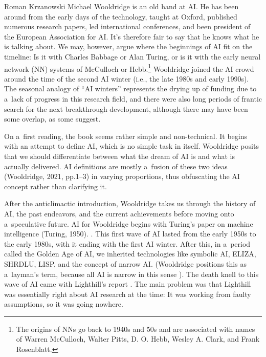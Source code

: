 \begin{newrevengenv}{Roman Krzanowski}
Michael Wooldridge is an old hand at AI. He has been around from the early days of the technology, taught at Oxford, published numerous research papers, led international conferences, and been president of the European Association for AI. It’s therefore fair to say that he knows what he is talking about. We may, however, argue where the beginnings of AI fit on the timeline: Is it with Charles Babbage or Alan Turing, or is it with the early neural network (NN) systems of McCulloch or Hebb.\footnote{The origins of NNs go back to 1940s and 50s and are associated with names of Warren McCulloch, Walter Pitts, D. O. Hebb, Wesley A. Clark, and Frank Rosenblatt.} Wooldridge joined the AI crowd around the time of the second AI winter (i.e., the late 1980s and early 1990s). The seasonal analogy of ``AI winters'' represents the drying up of funding due to a~lack of progress in this research field, and there were also long periods of frantic search for the next breakthrough development, although there may have been some overlap, as some suggest.

On a~first reading, the book seems rather simple and non-technical. It begins with an attempt to define AI, which is no simple task in itself. Wooldridge posits that we should differentiate between what the dream of AI is and what is actually delivered. AI definitions are mostly a~fusion of these two ideas (Wooldridge, 2021, pp.1–3) in varying proportions, thus obfuscating the AI concept rather than clarifying it.

After the anticlimactic introduction, Wooldridge takes us through the history of AI, the past endeavors, and the current achievements before moving onto a~speculative future. AI for Wooldridge begins with Turing’s paper on machine intelligence
(Turing, 1950).
\parencite{turing_computing_1950}.
This first wave of AI lasted from the early 1950s to the early 1980s, with it ending with the first AI winter. After this, in a~period called the Golden Age of AI, we inherited technologies like symbolic AI, ELIZA, SHRDLU, LISP, and the concept of narrow AI. (Wooldridge positions this as a~layman’s term, because all AI is narrow in this sense
\parencite[][p.42]{wooldridge_road_2021}%
). The death knell to this wave of AI came with Lighthill’s report
\parencite{lighthill_artificial_1973}.
The main problem was that Lighthill was essentially right about AI research at the time: It was working from faulty assumptions, so it was going nowhere.


\end{newrevengenv}
